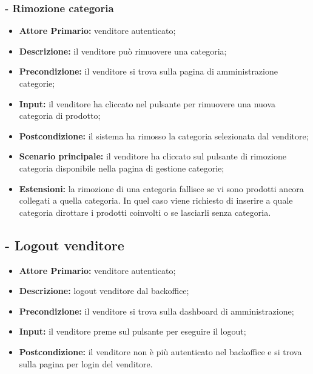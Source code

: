\subsubsection{- Rimozione categoria}
\begin{itemize}
    \item \textbf{Attore Primario:} venditore autenticato;
    \item \textbf{Descrizione:} il venditore può rimuovere una categoria;
    \item \textbf{Precondizione:} il venditore si trova sulla pagina di amministrazione categorie;
    \item \textbf{Input:} il venditore ha cliccato nel pulsante per rimuovere una nuova categoria di prodotto;
    \item \textbf{Postcondizione:} il sistema ha rimosso la categoria selezionata dal venditore;
    \item \textbf{Scenario principale:} il venditore ha cliccato sul pulsante di rimozione categoria disponibile nella pagina di gestione categorie;
    \item \textbf{Estensioni:} la rimozione di una categoria fallisce se vi sono prodotti ancora collegati a quella categoria. In quel caso viene richiesto
          di inserire a quale categoria dirottare i prodotti coinvolti o se lasciarli senza categoria.
\end{itemize}

\stepUserCase
\subsection{ - Logout venditore}
\begin{itemize}
    \item \textbf{Attore Primario:} venditore autenticato;
    \item \textbf{Descrizione:} logout venditore dal backoffice;
    \item \textbf{Precondizione:} il venditore si trova sulla dashboard di amministrazione;
    \item \textbf{Input:} il venditore preme sul pulsante per eseguire il logout;
    \item \textbf{Postcondizione:} il venditore non è più autenticato nel backoffice e si trova sulla pagina per login del venditore.
\end{itemize}

\stepUserCase
